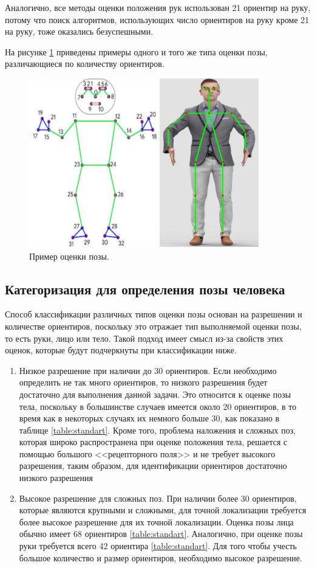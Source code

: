 Аналогично, все методы оценки положения рук использован 21 ориентир на руку, потому что поиск алгоритмов, использующих число ориентиров на руку кроме 21 на руку, тоже оказались безуспешными. 

На рисунке \ref{img:std} приведены примеры одного и того же типа оценки позы, различающиеся по количеству ориентиров.

\begin{figure}[ht!]
	\centering
	\includegraphics[width=0.6\linewidth]{assets/img-std.png}
	\caption{Пример оценки позы.}
	\label{img:std}
\end{figure}

\subsection{Категоризация для определения позы человека}

Способ классификации различных типов оценки позы основан на разрешении и количестве ориентиров, поскольку это отражает тип выполняемой оценки позы, то есть руки, лицо или тело.
Такой подход имеет смысл из-за свойств этих оценок, которые будут подчеркнуты при классификации ниже.

\begin{enumerate}[label=\arabic*)]

\item Низкое разрешение при наличии до 30 ориентиров. Если необходимо определить не так много ориентиров, то низкого разрешения будет достаточно для выполнения данной задачи. 
Это относится к оценке позы тела, поскольку в большинстве случаев имеется около 20 ориентиров, в то время как в некоторых случаях их немного больше 30, как показано в таблице \ref{table:standart}.
Кроме того, проблема наложения и сложных поз, которая широко распространена при оценке положения тела, решается с помощью большого <<рецепторного поля>> и не требует высокого разрешения, таким образом, для идентификации ориентиров достаточно низкого разрешения

\item Высокое разрешение для сложных поз.
При наличии более 30 ориентиров, которые являются крупными и сложными, для точной локализации требуется более высокое разрешение для их точной локализации.
Оценка позы лица обычно имеет 68 ориентиров \ref{table:standart}. Аналогично, при оценке позы руки требуется всего 42 ориентира \ref{table:standart}. Для того чтобы учесть большое количество и размер ориентиров, необходимо высокое разрешение.  

\end{enumerate}

